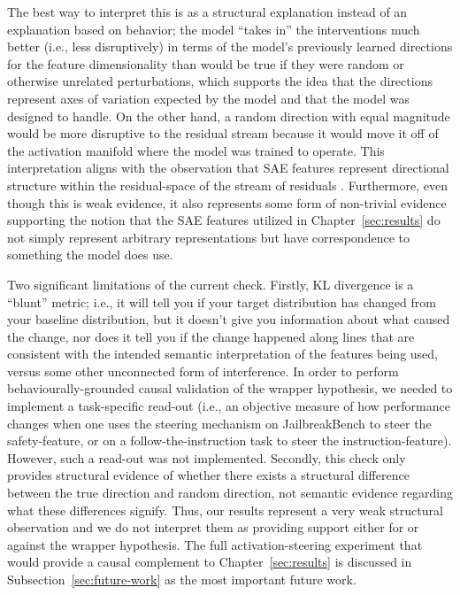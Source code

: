 The best way to interpret this is as a structural explanation instead of an explanation based on behavior; the model ``takes in'' the interventions much better (i.e., less disruptively) in terms of the model's previously learned directions for the feature dimensionality than would be true if they were random or otherwise unrelated perturbations, which supports the idea that the directions represent axes of variation expected by the model and that the model was designed to handle. On the other hand, a random direction with equal magnitude would be more disruptive to the residual stream because it would move it off of the activation manifold where the model was trained to operate. This interpretation aligns with the observation that SAE features represent directional structure within the residual-space of the stream of residuals \parencite{cunningham_sparse_2023, park_linear_2024}. Furthermore, even though this is weak evidence, it also represents some form of non-trivial evidence supporting the notion that the SAE features utilized in Chapter~\ref{sec:results} do not simply represent arbitrary representations but have correspondence to something the model does use.

Two significant limitations of the current check. Firstly, KL divergence is a ``blunt'' metric; i.e., it will tell you if your target distribution has changed from your baseline distribution, but it doesn't give you information about what caused the change, nor does it tell you if the change happened along lines that are consistent with the intended semantic interpretation of the features being used, versus some other unconnected form of interference. In order to perform behaviourally-grounded causal validation of the wrapper hypothesis, we needed to implement a task-specific read-out (i.e., an objective measure of how performance changes when one uses the steering mechanism on JailbreakBench to steer the safety-feature, or on a follow-the-instruction task to steer the instruction-feature). However, such a read-out was not implemented. Secondly, this check only provides structural evidence of whether there exists a structural difference between the true direction and random direction, not semantic evidence regarding what these differences signify. Thus, our results represent a very weak structural observation and we do not interpret them as providing support either for or against the wrapper hypothesis. The full activation-steering experiment that would provide a causal complement to Chapter~\ref{sec:results} is discussed in Subsection~\ref{sec:future-work} as the most important future work.

